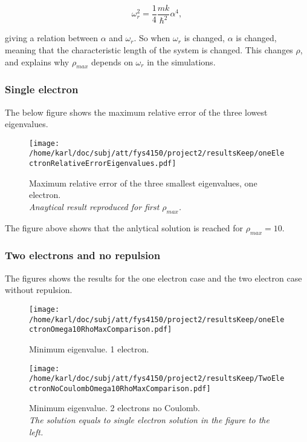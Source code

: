 \documentclass{article}
\begin{document}
\begin{equation*}
\omega_r^2=\frac{1}{4}\frac{mk}{\hbar^2} \alpha^4,
\end{equation*}

giving a relation between $\alpha$ and $\omega_r$. So when $\omega_r$ is changed, $\alpha$ is changed, meaning that the characteristic length of the system is changed. This changes $\rho$, and explains why $\rho_{max}$ depends on $\omega_r$ in the simulations.

\subsubsection{Single electron}
The below figure shows the maximum relative error of the three lowest eigenvalues.


\begin{figure}[H]
	\centering
	\texttt{[image: /home/karl/doc/subj/att/fys4150/project2/resultsKeep/oneElectronRelativeErrorEigenvalues.pdf]}
	\caption{Maximum relative error of the three smallest eigenvalues, one electron.\\
		\textit{Anaytical result reproduced for first $\rho_{max}$.}}
	\label{1}
\end{figure}

The figure above shows that the anlytical solution is reached for $\rho_{max} = 10$. 

\subsubsection{Two electrons and no repulsion}
The figures shows the results for the one electron case and the two electron case without repulsion.

\begin{minipage}{.49\textwidth} %
	\begin{figure}[H]
		\centering
		\texttt{[image: /home/karl/doc/subj/att/fys4150/project2/resultsKeep/oneElectronOmega10RhoMaxComparison.pdf]}
		\caption{Minimum eigenvalue. 1 electron.}
		\label{1}
	\end{figure}
\end{minipage}\hfill
\vspace{2ex}
\begin{minipage}{.49\textwidth}
	\begin{figure}[H]
		\centering
		\texttt{[image: /home/karl/doc/subj/att/fys4150/project2/resultsKeep/TwoElectronNoCoulombOmega10RhoMaxComparison.pdf]}
		\caption{Minimum eigenvalue. 2 electrons no Coulomb. \\
			\textit{The solution equals to single electron solution in the figure to the left.}}
		\label{1}
	\end{figure}
\end{minipage}\hfill
\vspace{2ex}
\end{document}
